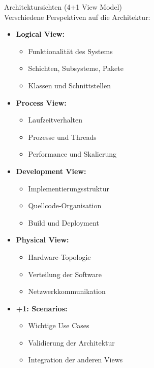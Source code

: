 \begin{concept}{Architektursichten (4+1 View Model)}\\
Verschiedene Perspektiven auf die Architektur:

\begin{itemize}
    \item \textbf{Logical View:}
    \begin{itemize}
        \item Funktionalität des Systems
        \item Schichten, Subsysteme, Pakete
        \item Klassen und Schnittstellen
    \end{itemize}
    
    \item \textbf{Process View:}
    \begin{itemize}
        \item Laufzeitverhalten
        \item Prozesse und Threads
        \item Performance und Skalierung
    \end{itemize}
    
    \item \textbf{Development View:}
    \begin{itemize}
        \item Implementierungsstruktur
        \item Quellcode-Organisation
        \item Build und Deployment
    \end{itemize}
    
    \item \textbf{Physical View:}
    \begin{itemize}
        \item Hardware-Topologie
        \item Verteilung der Software
        \item Netzwerkkommunikation
    \end{itemize}
    
    \item \textbf{+1: Scenarios:}
    \begin{itemize}
        \item Wichtige Use Cases
        \item Validierung der Architektur
        \item Integration der anderen Views
    \end{itemize}
\end{itemize}


\end{concept}
